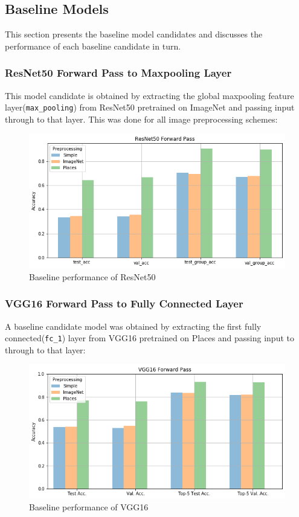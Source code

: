 \subsection{Baseline Models} \label{sec:baselinemodels}
This section presents the baseline model candidates and discusses the performance of each baseline candidate in turn.

\subsubsection{ResNet50 Forward Pass to Maxpooling Layer}
This model candidate is obtained by extracting the global maxpooling feature layer(\texttt{max\_pooling}) from ResNet50 pretrained on ImageNet and passing input through to that layer. This was done for all image preprocessing schemes:

\begin{figure}[H]
    \centering
    \includegraphics[scale=0.5]{pictures/plots/resnet50_fc_acc}
    \caption{Baseline performance of ResNet50}
    \label{fig:baselineresnet}
\end{figure}

\subsubsection{VGG16 Forward Pass to Fully Connected Layer}
A baseline candidate model was obtained by extracting the first fully connected(\texttt{fc\_1}) layer from VGG16 pretrained on Places and passing input to through to that layer:

\begin{figure}[H]
    \centering
    \includegraphics[scale=0.5]{pictures/plots/vgg_fc_acc}
    \caption{Baseline performance of VGG16}
    \label{fig:baselinevgg}
\end{figure}


